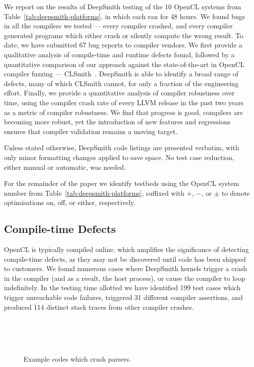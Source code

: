 We report on the results of DeepSmith testing of the 10 OpenCL systems from Table~\ref{tab:deepsmith-platforms}, in which each ran for 48 hours. We found bugs in all the compilers we tested --- every compiler crashed, and every compiler generated programs which either crash or silently compute the wrong result. To date, we have submitted 67 bug reports to compiler vendors. We first provide a qualitative analysis of compile-time and runtime defects found, followed by a quantitative comparison of our approach against the state-of-the-art in OpenCL compiler fuzzing --- CLSmith~\cite{Lidbury2015a}. DeepSmith is able to identify a broad range of defects, many of which CLSmith cannot, for only a fraction of the engineering effort. Finally, we provide a quantitative analysis of compiler robustness over time, using the compiler crash rate of every LLVM release in the past two years as a metric of compiler robustness. We find that progress is good, compilers are becoming more robust, yet the introduction of new features and regressions ensures that compiler validation remains a moving target.

Unless stated otherwise, DeepSmith code listings are presented verbatim, with only minor formatting changes applied to save space. No test case reduction, either manual or automatic, was needed.

For the remainder of the paper we identify testbeds using the OpenCL system number from Table~\ref{tab:deepsmith-platforms}, suffixed with $+$, $-$, or $\pm$ to denote optimisations on, off, or either, respectively.

\subsection{Compile-time Defects}%
\label{subsec:compile-time-defects}

OpenCL is typically compiled online, which amplifies the significance of detecting compile-time defects, as they may not be discovered until code has been shipped to customers. We found numerous cases where DeepSmith kernels trigger a crash in the compiler (and as a result, the host process), or cause the compiler to loop indefinitely. In the testing time allotted we have identified 199 test cases which trigger unreachable code failures, triggered 31 different compiler assertions, and produced 114 distinct stack traces from other compiler crashes.

\begin{figure}
  \centering %
  \\%
  \\%
  \\%
  \caption[Example codes which crash parsers]{%
    Example codes which crash parsers.%
  }%
  \label{lst:parser-crashes}
\end{figure}

